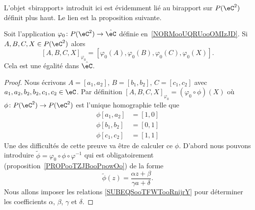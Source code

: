 L'objet «birapport» introduit ici est évidemment lié au birapport sur \( P(\eC^2)\) définit plus haut. Le lien est la proposition suivante.

\begin{proposition}     \label{PROPooLKQQooEOrjwC}
	Soit l'application \( \varphi_0\colon P(\eC^2)\to \hat\eC\) définie en~\ref{NORMooUQRUooOMIzJD}. Si \( A,B,C,X\in P(\eC^2) \) alors
	\begin{equation}        \label{EQooEOZZooMRHJfH}
		[A,B,C,X]_{\varphi_0}=[\varphi_0(A),\varphi_0(B),\varphi_0(C),\varphi_0(X)].
	\end{equation}
	Cela est une égalité dans \( \hat \eC\).
\end{proposition}

\begin{proof}
	Nous écrivons \( A=[a_1,a_2]\), \( B=[b_1,b_2]\), \( C=[c_1,c_2]\) avec \( a_1,a_2,b_2,b_2,c_1,c_2\in \eC\). Par définition \( [A,B,C,X]_{\varphi_0}=(\varphi_0\circ\phi)(X)\) où \( \phi\colon P(\eC^2)\to P(\eC^2)\) est l'unique homographie telle que
	\begin{subequations}        \label{SUBEQSooTFWTooRnijrY}
		\begin{align}
			\phi[a_1,a_2] & =[1,0] \\
			\phi[b_1,b_2] & =[0,1] \\
			\phi[c_1,c_2] & =[1,1]
		\end{align}
	\end{subequations}
	Une des difficultés de cette preuve va être de calculer ce \( \phi\). D'abord nous pouvons introduire \( \tilde \phi=\varphi_0\circ\phi\circ\varphi^{-1}\) qui est obligatoirement (proposition~\ref{PROPooTZJBooPpowOo}) de la forme
	\begin{equation}
		\tilde \phi(z)=\frac{ \alpha z+\beta }{ \gamma a+\delta }.
	\end{equation}
	Nous allons imposer les relations \eqref{SUBEQSooTFWTooRnijrY} pour déterminer les coefficients \( \alpha\), \( \beta\), \( \gamma\) et \( \delta\).


\end{proof}
